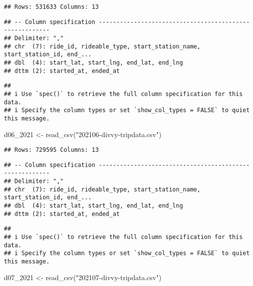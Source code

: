 \documentclass[
]{article}
\newenvironment{Shaded}{\begin{snugshade}}{\end{snugshade}}
\newcommand{\FunctionTok}[1]{\textcolor[rgb]{0.00,0.00,0.00}{#1}}
\newcommand{\NormalTok}[1]{#1}
\newcommand{\OtherTok}[1]{\textcolor[rgb]{0.56,0.35,0.01}{#1}}
\newcommand{\StringTok}[1]{\textcolor[rgb]{0.31,0.60,0.02}{#1}}
\begin{document}
\begin{verbatim}
## Rows: 531633 Columns: 13
\end{verbatim}

\begin{verbatim}
## -- Column specification --------------------------------------------------------
## Delimiter: ","
## chr  (7): ride_id, rideable_type, start_station_name, start_station_id, end_...
## dbl  (4): start_lat, start_lng, end_lat, end_lng
## dttm (2): started_at, ended_at
\end{verbatim}

\begin{verbatim}
## 
## i Use `spec()` to retrieve the full column specification for this data.
## i Specify the column types or set `show_col_types = FALSE` to quiet this message.
\end{verbatim}

\begin{Shaded}
\begin{Highlighting}[]
\NormalTok{d06\_2021 }\OtherTok{\textless{}{-}} \FunctionTok{read\_csv}\NormalTok{(}\StringTok{"202106{-}divvy{-}tripdata.csv"}\NormalTok{)}
\end{Highlighting}
\end{Shaded}

\begin{verbatim}
## Rows: 729595 Columns: 13
\end{verbatim}

\begin{verbatim}
## -- Column specification --------------------------------------------------------
## Delimiter: ","
## chr  (7): ride_id, rideable_type, start_station_name, start_station_id, end_...
## dbl  (4): start_lat, start_lng, end_lat, end_lng
## dttm (2): started_at, ended_at
\end{verbatim}

\begin{verbatim}
## 
## i Use `spec()` to retrieve the full column specification for this data.
## i Specify the column types or set `show_col_types = FALSE` to quiet this message.
\end{verbatim}

\begin{Shaded}
\begin{Highlighting}[]
\NormalTok{d07\_2021 }\OtherTok{\textless{}{-}} \FunctionTok{read\_csv}\NormalTok{(}\StringTok{"202107{-}divvy{-}tripdata.csv"}\NormalTok{)}
\end{Highlighting}
\end{Shaded}
\end{document}
